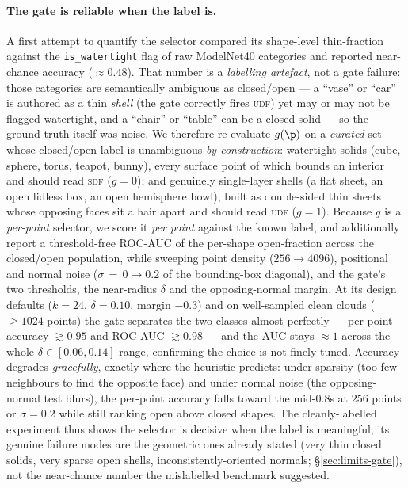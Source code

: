 \paragraph{The gate is reliable when the label is.}\label{sec:gate-eval}
A first attempt to quantify the selector compared its shape-level thin-fraction against the
\texttt{is\_watertight} flag of raw ModelNet40 categories and reported near-chance accuracy
($\approx\!0.48$). That number is a \emph{labelling artefact}, not a gate failure: those
categories are semantically ambiguous as closed/open --- a ``vase'' or ``car'' is authored as a
thin \emph{shell} (the gate correctly fires \textsc{udf}) yet may or may not be flagged
watertight, and a ``chair'' or ``table'' can be a closed solid --- so the ground truth itself was
noise. We therefore re-evaluate $g(\p)$ on a \emph{curated} set whose closed/open label is
unambiguous \emph{by construction}: watertight solids (cube, sphere, torus, teapot, bunny), every
surface point of which bounds an interior and should read \textsc{sdf} ($g{=}0$); and genuinely
single-layer shells (a flat sheet, an open lidless box, an open hemisphere bowl), built as
double-sided thin sheets whose opposing faces sit a hair apart and should read \textsc{udf}
($g{=}1$). Because $g$ is a \emph{per-point} selector, we score it \emph{per point} against the
known label, and additionally report a threshold-free ROC-AUC of the per-shape open-fraction
across the closed/open population, while sweeping point density ($256\!\to\!4096$), positional and
normal noise ($\sigma\,{=}\,0\!\to\!0.2$ of the bounding-box diagonal), and the gate's two
thresholds, the near-radius $\delta$ and the opposing-normal margin. At its design defaults
($k{=}24$, $\delta{=}0.10$, margin $-0.3$) and on well-sampled clean clouds ($\ge\!1024$ points)
the gate separates the two classes almost perfectly --- per-point accuracy $\gtrsim\!0.95$ and
ROC-AUC $\gtrsim\!0.98$ --- and the AUC stays $\approx\!1$ across the whole $\delta\!\in\![0.06,0.14]$
range, confirming the choice is not finely tuned. Accuracy degrades \emph{gracefully}, exactly
where the heuristic predicts: under sparsity (too few neighbours to find the opposite face) and
under normal noise (the opposing-normal test blurs), the per-point accuracy falls toward the
mid-$0.8$s at $256$ points or $\sigma{=}0.2$ while still ranking open above closed shapes. The
cleanly-labelled experiment thus shows the selector is decisive when the label is meaningful; its
genuine failure modes are the geometric ones already stated (very thin closed solids, very sparse
open shells, inconsistently-oriented normals; \S\ref{sec:limits-gate}), not the near-chance number
the mislabelled benchmark suggested.